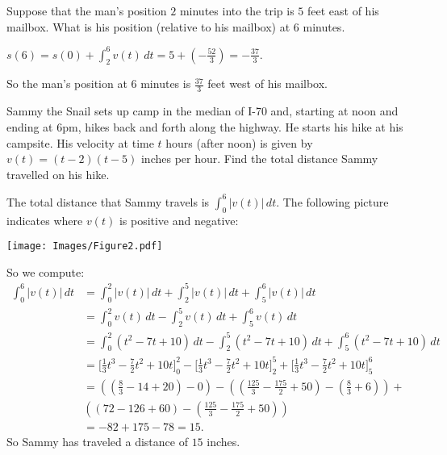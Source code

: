 \documentclass[handout, nooutcomes]{ximera}
\renewenvironment{freeResponse}{
\ifhandout\setbox0\vbox\bgroup\else
\begin{trivlist}\item[\hskip \labelsep\bfseries Solution:\hspace{2ex}]
\fi}
{\ifhandout\egroup\else
\end{trivlist}
\fi}
\renewcommand{\d}{\,d}
\newcommand{\eval}[1]{\bigg[ #1 \bigg]}
\begin{document}
\begin{problem}
\begin{enumerate}
\begin{enumerate}
		\item[iii.]  Suppose that the man's position $2$ minutes into the trip is $5$ feet east of his mailbox.  What is his position (relative to his mailbox) at $6$ minutes.
			\begin{freeResponse}
			$s(6) = s(0) + \int_2^6 v(t) \d t = 5 + \left(- \frac{52}{3} \right) = - \frac{37}{3}. $

			So the man's position at $6$ minutes is $\frac{37}{3}$ feet west of his mailbox.
			\end{freeResponse}
		\end{enumerate}

	\item  Sammy the Snail sets up camp in the median of I-70 and, starting at noon and ending at 6pm, hikes back and forth along the highway.  He starts his hike at his campsite.  His velocity at time $t$ hours (after noon)  is given by $v(t)=(t-2)(t-5)$ inches per hour.  Find the total distance Sammy travelled on his hike.
		\begin{freeResponse}
		The total distance that Sammy travels is $\int_0^6 \left| v(t) \right| \d t$.
		The following picture indicates where $v(t)$ is positive and negative:
			\begin{image}
			\texttt{[image: Images/Figure2.pdf]}
			\end{image}
		So we compute:
			\begin{align*}
			\int_0^6 \left| v(t) \right| \d t &= \int_0^2 \left| v(t) \right| \d t + \int_2^5 \left| v(t) \right| \d t + \int_5^6 \left| v(t) \right| \d t  \\
			&= \int_0^2 v(t) \d t - \int_2^5 v(t) \d t + \int_5^6 v(t) \d t  \\
			&= \int_0^2 (t^2 - 7t + 10) \d t - \int_2^5 (t^2 - 7t + 10) \d t + \int_5^6 (t^2 - 7t + 10) \d t  \\
			&= \eval{\frac{1}{3}t^3-\frac{7}{2}t^2+10t}_0^2-\eval{\frac{1}{3}t^3-\frac{7}{2}t^2+10t}_2^5+\eval{\frac{1}{3}t^3-\frac{7}{2}t^2+10t}_5^6  \\
			&= \left( \left(\frac{8}{3}-14+20 \right)-0\right)-\left( \left( \frac{125}{3}-\frac{175}{2}+50 \right)-\left( \frac{8}{3}+6 \right) \right)+  \\
			&\left( \left( 72-126+60 \right) - \left( \frac{125}{3} - \frac{175}{2} + 50 \right) \right)  \\
			&= -82+175-78=15.
			\end{align*}
		So Sammy has traveled a distance of $15$ inches.
		\end{freeResponse}
	\end{enumerate}
\end{problem}
\end{document}
